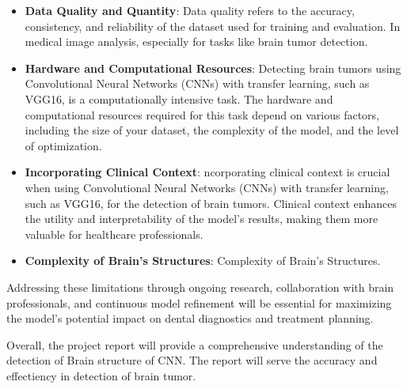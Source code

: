 \begin{itemize}
    \item \textbf{Data Quality and Quantity}:  Data quality refers to the accuracy, consistency, and reliability of the dataset used for training and evaluation. In medical image analysis, especially for tasks like brain tumor detection.
     \item \textbf{Hardware and Computational Resources}: Detecting brain tumors using Convolutional Neural Networks (CNNs) with transfer learning, such as VGG16, is a computationally intensive task. The hardware and computational resources required for this task depend on various factors, including the size of your dataset, the complexity of the model, and the level of optimization.
    \item \textbf{Incorporating Clinical Context}:  ncorporating clinical context is crucial when using Convolutional Neural Networks (CNNs) with transfer learning, such as VGG16, for the detection of brain tumors. Clinical context enhances the utility and interpretability of the model's results, making them more valuable for healthcare professionals.
    \item \textbf{Complexity of Brain's  Structures}: Complexity of Brain's Structures.
\end{itemize}


Addressing these limitations through ongoing research, collaboration with brain professionals, and continuous model refinement will be essential for maximizing the model's potential impact on dental diagnostics and treatment planning.
 
Overall, the project report will provide a comprehensive understanding of the detection of Brain structure of  CNN. The report will serve the accuracy and effectiency in detection of brain tumor.